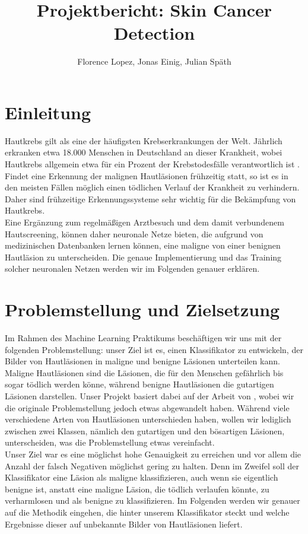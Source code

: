 \documentclass[a4paper, doc]{apa6}
\title{Projektbericht: Skin Cancer Detection}
\author{Florence Lopez, Jonas Einig, Julian Späth }
\affiliation{Department of Computer Science, University of Tübingen}
\begin{document}
\maketitle
\begin{abstract}
    
    \lipsum[1]
\end{abstract}
    
    
\section{Einleitung}

Hautkrebs gilt als eine der häufigsten Krebserkrankungen der Welt. Jährlich erkranken etwa 18.000 Menschen in Deutschland an dieser Krankheit, wobei Hautkrebs allgemein etwa für ein Prozent der Krebstodesfälle verantwortlich ist \citet{hautkrebs}. Findet eine Erkennung der malignen Hautläsionen frühzeitig statt, so ist es in den meisten Fällen möglich einen tödlichen Verlauf der Krankheit zu verhindern. Daher sind frühzeitige Erkennungssysteme sehr wichtig für die Bekämpfung von Hautkrebs.\\
\noindent Eine Ergänzung zum regelmäßigen Arztbesuch und dem damit verbundenem Hautscreening, können daher neuronale Netze bieten, die aufgrund von medizinischen Datenbanken lernen können, eine maligne von einer benignen Hautläsion zu unterscheiden. Die genaue Implementierung und das Training solcher neuronalen Netzen werden wir im Folgenden genauer erklären. 

\section{Problemstellung und Zielsetzung}

Im Rahmen des Machine Learning Praktikums beschäftigen wir uns mit der folgenden Problemstellung: unser Ziel ist es, einen Klassifikator zu entwickeln, der Bilder von Hautläsionen in maligne und benigne Läsionen unterteilen kann. Maligne Hautläsionen sind die Läsionen, die für den Menschen gefährlich bis sogar tödlich werden könne, während benigne Hautläsionen die gutartigen Läsionen darstellen. Unser Projekt basiert dabei auf der Arbeit von \citet{esteva2017dermatologist}, wobei wir die originale Problemstellung jedoch etwas abgewandelt haben. Während \citet{esteva2017dermatologist} viele verschiedene Arten von Hautläsionen unterschieden haben, wollen wir lediglich zwischen zwei Klassen, nämlich den gutartigen und den bösartigen Läsionen, unterscheiden, was die Problemstellung etwas vereinfacht.\\
Unser Ziel war es eine möglichst hohe Genauigkeit zu erreichen und vor allem die Anzahl der falsch Negativen möglichst gering zu halten. Denn im Zweifel soll der Klassifikator eine Läsion als maligne klassifizieren, auch wenn sie eigentlich benigne ist, anstatt eine maligne Läsion, die tödlich verlaufen könnte, zu verharmlosen und als benigne zu klassifizieren. Im Folgenden werden wir genauer auf die Methodik eingehen, die hinter unserem Klassifikator steckt und welche Ergebnisse dieser auf unbekannte Bilder von Hautläsionen liefert. 
\end{document}
